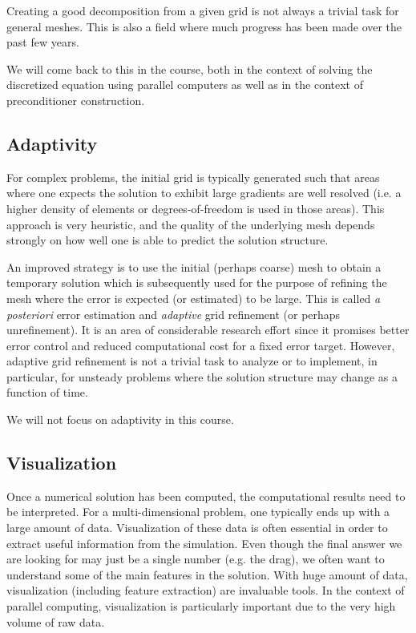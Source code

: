 Creating a good decomposition from a given grid is not always a trivial task for
general meshes. This is also a field where much progress has been made over the
past few years.

We will come back to this in the course, both in the context of solving the
discretized equation using parallel computers as well as in the context of
preconditioner construction.

\subsection{Adaptivity}

For complex problems, the initial grid is typically generated such that areas
where one expects the solution to exhibit large gradients are well resolved
(i.e. a higher density of elements or degrees-of-freedom is used in those
areas). This approach is very heuristic, and the quality of the underlying mesh
depends strongly on how well one is able to predict the solution structure.

An improved strategy is to use the initial (perhaps coarse) mesh to obtain a
temporary solution which is subsequently used for the purpose of refining the
mesh where the error is expected (or estimated) to be large. This is called
\emph{a posteriori} error estimation and \emph{adaptive} grid refinement (or
perhaps unrefinement). It is an area of considerable research effort since it
promises better error control and reduced computational cost for a fixed error
target. However, adaptive grid refinement is not a trivial task to analyze or to
implement, in particular, for unsteady problems where the solution structure may
change as a function of time.

We will not focus on adaptivity in this course.

\subsection{Visualization}

Once a numerical solution has been computed, the computational results need to
be interpreted. For a multi-dimensional problem, one typically ends up with a
large amount of data. Visualization of these data is often essential in order to
extract useful information from the simulation. Even though the final answer we
are looking for may just be a single number (e.g. the drag), we often want to
understand some of the main features in the solution. With huge amount of data,
visualization (including feature extraction) are invaluable tools. In the
context of parallel computing, visualization is particularly important due to
the very high volume of raw data.

